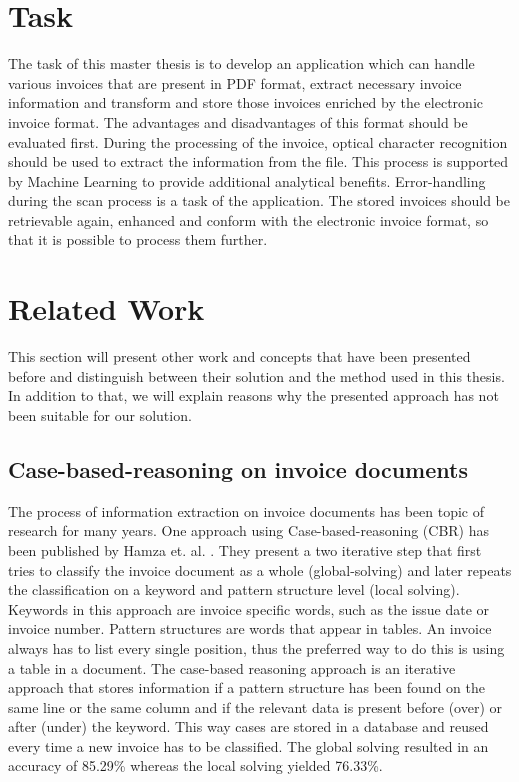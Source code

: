 \section{Task}
\label{sec1.3}

The task of this master thesis is to develop an application which can handle various invoices that are present in PDF format, extract necessary invoice information and transform and store those invoices enriched by the electronic invoice format. The advantages and disadvantages of this format should be evaluated first.
During the processing of the invoice, optical character recognition should be used to extract the information from the file. This process is supported by Machine Learning to provide additional analytical benefits.
Error-handling during the scan process is a task of the application.
The stored invoices should be retrievable again, enhanced and conform with the electronic invoice format, so that it is possible to process them further.

\section{Related Work}
\label{sec1.4}
This section will present other work and concepts that have been presented before and distinguish between their solution and the method used in this thesis. In addition to that, we will explain reasons why the presented approach has not been suitable for our solution.

\subsection{Case-based-reasoning on invoice documents}
The process of information extraction on invoice documents has been topic of research for many years. One approach using Case-based-reasoning (CBR) has been published by Hamza et. al. \cite{hamza07}. They present a two iterative step that first tries to classify the invoice document as a whole (global-solving) and later repeats the classification on a keyword and pattern structure level (local solving). Keywords in this approach are invoice specific words, such as the issue date or invoice number. Pattern structures are words that appear in tables. An invoice always has to list every single position, thus the preferred way to do this is using a table in a document.
The case-based reasoning approach is an iterative approach that stores information if a pattern structure has been found on the same line or the same column and if the relevant data is present before (over) or after (under) the keyword. This way cases are stored in a database and reused every time a new invoice has to be classified. The global solving resulted in an accuracy of 85.29\% whereas the local solving yielded 76.33\%.

